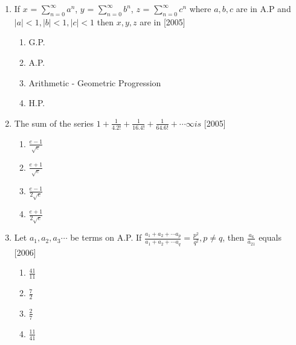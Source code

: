 \documentclass[journal,12pt,twocolumn]{IEEEtran}
\theoremstyle{remark}
\begin{document}
\begin{enumerate}[label={\arabic*.}]
\item {If $x$ = $\sum\limits_{n=0}^{\infty}a^n$, $y$ = $\sum\limits_{n=0}^{\infty}b^n$, $z$ = $\sum\limits_{n=0}^{\infty}c^n$ where $a,b,c$ are in A.P and $|a|<1,|b|<1,|c|<1$ then $x,y,z$ are in}
{\hfill{[2005]}} 
\begin{enumerate}[label={(\alph*)}]
\item  {G.P.}
\item  {A.P.}
\item  {Arithmetic - Geometric Progression}
\item  {H.P.}
\end{enumerate}

\item {The sum of the series $1+\frac{1}{4.2!}+\frac{1}{16.4!}+\frac{1}{64.6!}+\cdots \infty is$}
{\hfill{[2005]}} 
\begin{enumerate}[label={(\alph*)}]
\item  {$\frac{e-1}{\sqrt{e}}$}
\item  {$\frac{e+1}{\sqrt{e}}$}
\item  {$\frac{e-1}{2\sqrt{e}}$}
\item  {$\frac{e+1}{2\sqrt{e}}$}
\end{enumerate}

\item {Let $a_1, a_2, a_3 \cdots$ be terms on A.P. If $\frac{a_1+a_2+\cdots a_p}{a_1+a_2+\cdots a_q}= \frac{p^2}{q^2},p \neq q$, then $\frac{a_6}{a_{21}}$ equals}
{\hfill{[2006]} }
\begin{enumerate}[label={(\alph*)}]
\item  {$\frac{41}{11}$}
\item  {$\frac{7}{2}$}
\item  {$\frac{2}{7}$}
\item  {$\frac{11}{41}$}
\end{enumerate}




\end{enumerate}
\end{document}

